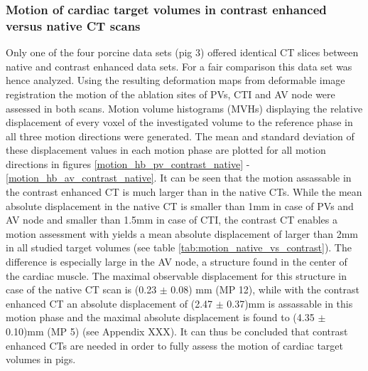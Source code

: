 \documentclass[type=dr, dr=rernat, accentcolor=tud7b,colorbacktitle, bigchapter, openright, twoside, 12pt ]{tudthesis}
\begin{document}
\subsubsection*{Motion of cardiac target volumes in contrast enhanced versus native CT scans}

Only one of the four porcine data sets (pig 3) offered identical CT slices between native and contrast enhanced data sets. For a fair 
comparison this data set was hence analyzed. Using the resulting deformation maps from deformable image registration the motion of the 
ablation sites of PVs, CTI and AV node were assessed in both scans. Motion volume histograms (MVHs) \cite{Ric13} displaying the relative 
displacement of every voxel of the investigated volume to the reference phase in all three motion directions were generated. The mean and 
standard deviation of these displacement values in each motion phase are plotted for all motion directions in figures \ref{motion_hb_pv_contrast_native} - 
\ref{motion_hb_av_contrast_native}.
It can be seen that the motion assassable in the contrast enhanced CT is much larger than in the native CTs. While the mean absolute 
displacement in the native CT is smaller than 1mm in case of PVs and AV node and smaller than 1.5mm in case of CTI, the contrast CT enables a 
motion assessment with yields a mean absolute displacement of larger than 2mm in all studied target volumes (see table \ref{tab:motion_native_vs_contrast}). 
The difference is especially large in the AV node, a structure found in the center of the cardiac muscle. The maximal observable displacement 
for this structure in case of the native CT scan is (0.23 $\pm$ 0.08) mm (MP 12), while with the contrast enhanced CT an absolute displacement of (2.47 $\pm$ 0.37)mm is 
assassable in this motion phase and the maximal absolute displacement is found to (4.35 $\pm$ 0.10)mm (MP 5) (see Appendix XXX). It can thus 
be concluded that contrast enhanced CTs are needed in order to fully assess the motion of cardiac target volumes in pigs. 

\newpage

\vspace*{0.5cm}
\end{document}
